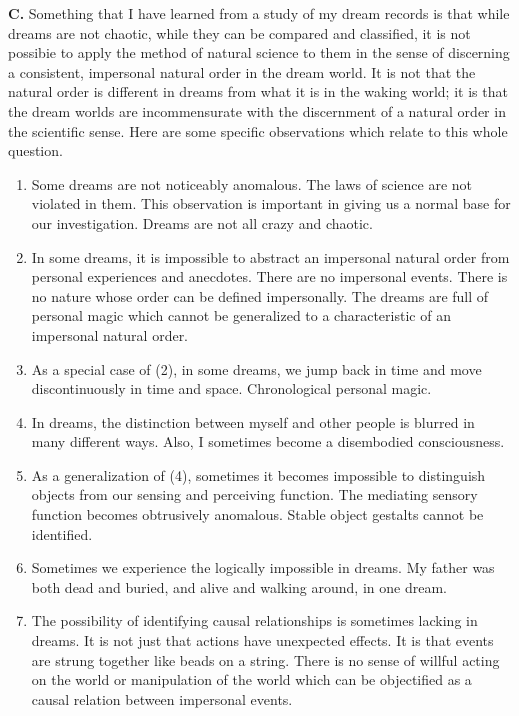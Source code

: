 \documentclass[10pt,twoside,draft]{memoir}
\begin{document}
{{\textbf{C.} Something that I have learned from a study of my dream records is 
that while dreams are not chaotic, while they can be compared and 
classified, it is not possibie to apply the method of natural science to them in 
the sense of discerning a consistent, impersonal natural order in the dream 
world. It is not that the natural order is different in dreams from what it is in 
the waking world; it is that the dream worlds are incommensurate with the 
discernment of a natural order in the scientific sense. Here are some specific 
observations which relate to this whole question. 

\begin{enumerate}
	\item Some dreams are not noticeably anomalous. The laws of science are not 
violated in them. This observation is important in giving us a normal base for 
our investigation. Dreams are not all crazy and chaotic. 

\item In some dreams, it is impossible to abstract an impersonal natural order 
from personal experiences and anecdotes. There are no impersonal events. 
There is no nature whose order can be defined impersonally. The dreams are 
full of personal magic which cannot be generalized to a characteristic of an 
impersonal natural order. 

\item As a special case of (2), in some dreams, we jump back in time and move 
discontinuously in time and space. Chronological personal magic. 

\item In dreams, the distinction between myself and other people is blurred in 
many different ways. Also, I sometimes become a disembodied 
consciousness. 

\item As a generalization of (4), sometimes it becomes impossible to distinguish 
objects from our sensing and perceiving function. The mediating sensory 
function becomes obtrusively anomalous. Stable object gestalts cannot be 
identified. 

\item Sometimes we experience the logically impossible in dreams. My father 
was both dead and buried, and alive and walking around, in one dream. 

\item The possibility of identifying causal relationships is sometimes lacking in 
dreams. It is not just that actions have unexpected effects. It is that events 
are strung together like beads on a string. There is no sense of willful acting 
on the world or manipulation of the world which can be objectified as a 
causal relation between impersonal events. 
\end{enumerate}

}}
\end{document}
